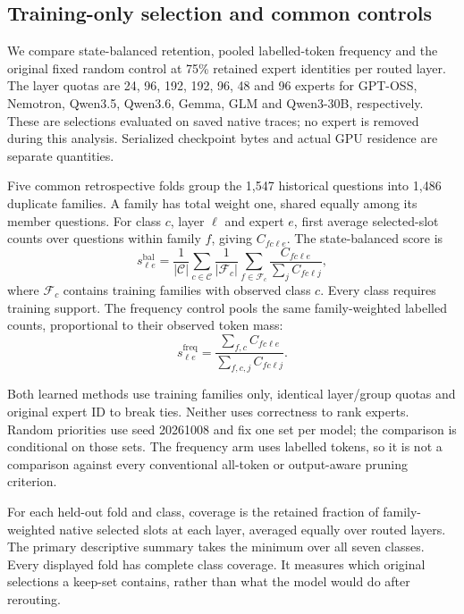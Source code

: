 \subsection{Training-only selection and common controls}
\label{sec:expert-memory-study}

We compare state-balanced retention, pooled labelled-token frequency and
the original fixed random control at 75\% retained expert identities per
routed layer. The layer quotas are 24, 96, 192, 192, 96, 48 and 96 experts
for GPT-OSS, Nemotron, Qwen3.5, Qwen3.6, Gemma, GLM and Qwen3-30B,
respectively. These are selections evaluated on saved native traces;
no expert is removed during this analysis. Serialized checkpoint bytes
and actual GPU residence are separate quantities.

Five common retrospective folds group the 1,547 historical questions into
1,486 duplicate families. A family has total weight one, shared equally among
its member questions. For class $c$, layer $\ell$ and expert $e$, first average
selected-slot counts over questions within family $f$, giving $C_{fc\ell e}$.
The state-balanced score is
\begin{equation}
 s^{\mathrm{bal}}_{\ell e}
 =\frac{1}{|\mathcal C|}\sum_{c\in\mathcal C}
   \frac{1}{|\mathcal F_c|}\sum_{f\in\mathcal F_c}
   \frac{C_{fc\ell e}}{\sum_j C_{fc\ell j}},
\end{equation}
where $\mathcal F_c$ contains training families with observed class $c$.
Every class requires training support. The frequency control pools the same
family-weighted labelled counts, proportional to their observed token mass:
\begin{equation}
 s^{\mathrm{freq}}_{\ell e}
 =\frac{\sum_{f,c}C_{fc\ell e}}{\sum_{f,c,j}C_{fc\ell j}}.
\end{equation}

Both learned methods use training families only, identical layer/group
quotas and original expert ID to break ties. Neither uses correctness to
rank experts. Random priorities use seed 20261008 and fix one set per
model; the comparison is conditional on those sets. The frequency arm
uses labelled tokens, so it is not a comparison against every conventional
all-token or output-aware pruning criterion.

For each held-out fold and class, coverage is the retained fraction of
family-weighted native selected slots at each layer, averaged equally
over routed layers. The primary descriptive summary takes the minimum
over all seven classes. Every displayed fold has complete class coverage.
It measures which original selections a keep-set contains, rather than
what the model would do after rerouting.

